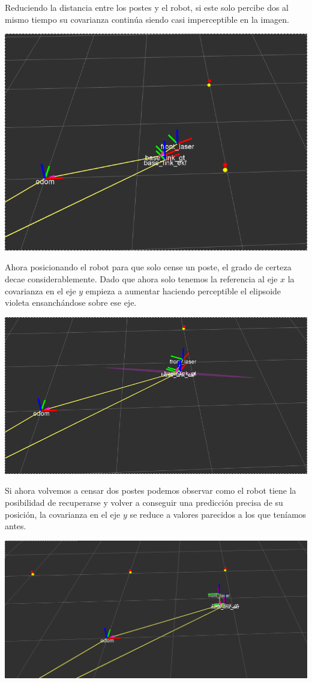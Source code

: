 Reduciendo la distancia entre los postes y el robot, si este solo percibe dos al mismo tiempo su covarianza continúa siendo casi imperceptible en la imagen.

\includegraphics[scale=0.3]{punto4/ekfViendoDosPostes.png}

Ahora posicionando el robot para que solo cense un poste, el grado de certeza decae considerablemente. Dado que ahora solo tenemos la referencia al eje $x$ la covarianza en el eje $y$ empieza a aumentar haciendo perceptible el elipsoide violeta ensanchándose sobre ese eje.

\includegraphics[scale=0.3]{punto4/ekfViendoUnPoste.png}

Si ahora volvemos a censar dos postes podemos observar como el robot tiene la posibilidad de recuperarse y volver a conseguir una predicción precisa de su posición, la covarianza en el eje $y$ se reduce a valores parecidos a los que teníamos antes.

\includegraphics[scale=0.3]{punto4/ekfViendoTresPostesOtraVez.png}

